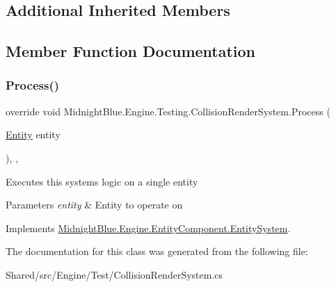 \subsection*{Additional Inherited Members}


\subsection{Member Function Documentation}
\hypertarget{class_midnight_blue_1_1_engine_1_1_testing_1_1_collision_render_system_aac900f09888531eaad6453b8534f99ab}{}\label{class_midnight_blue_1_1_engine_1_1_testing_1_1_collision_render_system_aac900f09888531eaad6453b8534f99ab} 
\subsubsection{\texorpdfstring{Process()}{Process()}}
{\footnotesize\ttfamily override void Midnight\+Blue.\+Engine.\+Testing.\+Collision\+Render\+System.\+Process (\begin{DoxyParamCaption}\item[{\hyperlink{class_midnight_blue_1_1_engine_1_1_entity_component_1_1_entity}{Entity}}]{entity }\end{DoxyParamCaption})\hspace{0.3cm}{\ttfamily [inline]}, {\ttfamily [protected]}, {\ttfamily [virtual]}}



Executes this systems logic on a single entity 


\begin{DoxyParams}{Parameters}
{\em entity} & Entity to operate on\\
\hline
\end{DoxyParams}


Implements \hyperlink{class_midnight_blue_1_1_engine_1_1_entity_component_1_1_entity_system_a94aa715ac6bfe9a720c3d12d56c7598c}{Midnight\+Blue.\+Engine.\+Entity\+Component.\+Entity\+System}.



The documentation for this class was generated from the following file\+:\begin{DoxyCompactItemize}
\item 
Shared/src/\+Engine/\+Test/Collision\+Render\+System.\+cs\end{DoxyCompactItemize}
